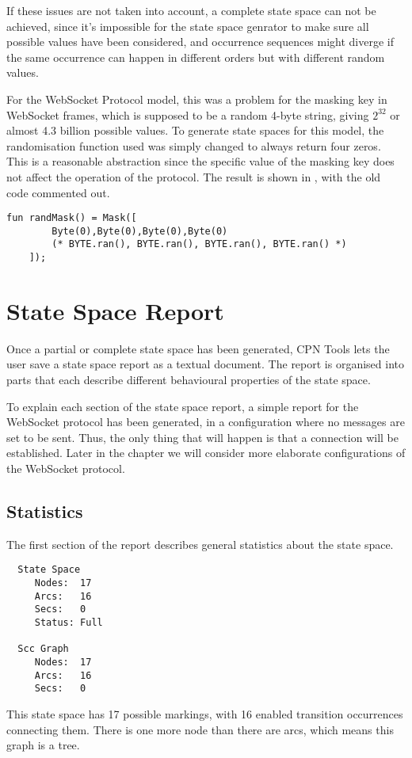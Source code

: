 		If these issues are not taken into account, a complete state space can not be
		achieved, since it's impossible for the state space genrator to make sure all
		possible values have been considered, and occurrence sequences might diverge
		if the same occurrence can happen in different orders but with different
		random values.
		
		For the WebSocket Protocol model, this was a problem for the masking
		key in WebSocket frames, which is supposed to be a random 4-byte string,
		giving $2^{32}$ or almost 4.3 billion possible values.
		To generate state spaces for this model, the randomisation function used was
		simply changed to always return four zeros. This is a reasonable abstraction
		since the specific value of the masking key does not affect the operation of
		the protocol. The result is shown in , with the old
		code commented out.
		
	\begin{lstlisting}[label=lst:fixed_masking_key,caption=Fixed masking key] 
	fun	randMask() = Mask([ 
		Byte(0),Byte(0),Byte(0),Byte(0)
		(* BYTE.ran(), BYTE.ran(), BYTE.ran(), BYTE.ran() *)
	]);
	\end{lstlisting}

\section{State Space Report}
Once a partial or complete state space has been generated, CPN Tools lets the
user save a state space report as a textual document. The report is organised
into parts that each describe different behavioural properties of the state
space.

To explain each section of the state space report, a simple report for the
WebSocket protocol has been generated, in a configuration where no messages are
set to be sent. Thus, the only thing that will happen is that a connection will
be established. Later in the chapter we will consider more elaborate
configurations of the WebSocket protocol.
	
	\subsection{Statistics}
	The first section of the report describes general statistics about the state
	space.
	\begin{lstlisting}
  State Space
     Nodes:  17
     Arcs:   16
     Secs:   0
     Status: Full

  Scc Graph
     Nodes:  17
     Arcs:   16
     Secs:   0

	\end{lstlisting}
	This state space has 17 possible markings, with 16 enabled transition
	occurrences connecting them. There is one more node than there are arcs, which
	means this graph is a tree.
	
